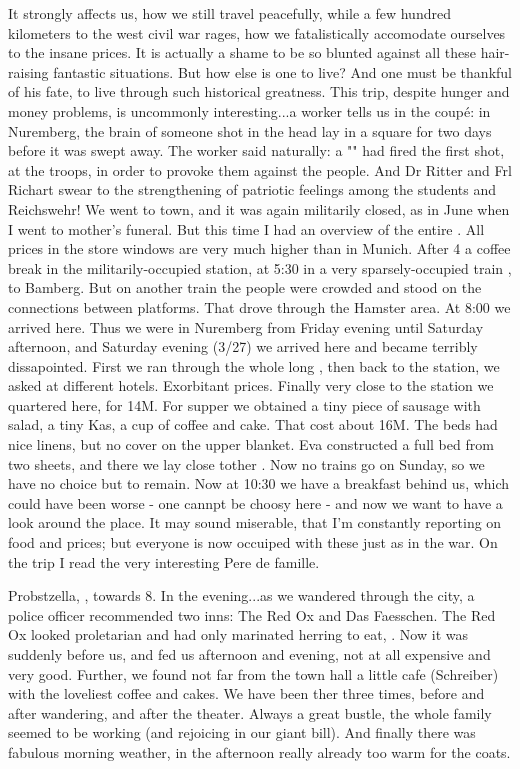 \documentclass{article}
\begin{document}
It strongly affects us, how we still travel peacefully, while a few hundred kilometers to the west civil war rages, how we fatalistically accomodate ourselves to the insane prices. It is actually a shame to be so blunted against all these hair-raising fantastic situations. But how else is one to live? And one must be thankful of his fate, to live through such historical greatness. This trip, despite hunger and money problems, is uncommonly interesting...a worker tells us in the coup\'e: in Nuremberg, the brain of someone shot in the head lay in a square for two days before it was swept away. The worker said naturally: a "" had fired the first shot, at the troops, in order to provoke them against the people. And Dr Ritter and Frl Richart swear to the strengthening of patriotic feelings among the students and Reichswehr!
We went to town, and it was again militarily closed, as in June when I went to mother's funeral. But this time I had an overview of the entire . 
All prices in the store windows are very much higher than in Munich. After 4 a coffee break in the militarily-occupied station, at 5:30 in a very sparsely-occupied train , to Bamberg. But on another train the people were crowded and stood on the connections between platforms. That drove through the Hamster area. At 8:00 we arrived here. Thus we were in Nuremberg from Friday evening until Saturday afternoon, and Saturday evening (3/27) we arrived here and became terribly dissapointed. First we ran through the whole long , then back to the station, we asked at different hotels. Exorbitant prices. Finally very close to the station we quartered here, for 14M. For supper we obtained a tiny piece of sausage with salad, a tiny Kas, a cup of coffee and cake. That cost about 16M. The beds had nice linens, but no cover on the upper blanket. Eva constructed a full bed from two sheets, and there we lay close tother . Now no trains go on Sunday, so we have no choice but to remain. Now at 10:30 we have a breakfast behind us, which could have been worse - one cannpt be choosy here - and now we want to have a look around the place. It may sound miserable, that I'm constantly reporting on food and prices; but everyone is now occuiped with these just as in the war. 
On the trip I read the very interesting Pere de famille.

\date{March 30, 1920}
Probstzella, , towards 8.
In the evening...as we wandered through the city, a police officer recommended two inns: The Red Ox and Das Faesschen. The Red Ox looked proletarian and had only marinated herring to eat, . Now it was suddenly before us, and fed us afternoon and evening, not at all expensive and very good. Further, we found not far from the town hall a little cafe (Schreiber) with the loveliest coffee and cakes. We have been ther three times, before and after wandering, and after the theater. Always a great bustle, the whole family seemed to be working (and rejoicing in our giant bill). And finally there was fabulous morning weather, in the afternoon really already too warm for the coats.
\end{document}
